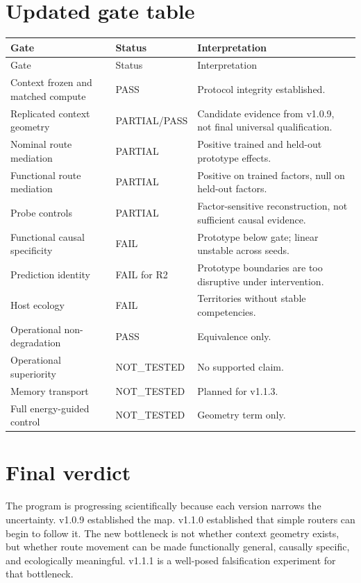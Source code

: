 \documentclass[11pt,a4paper]{article}
\begin{document}
\section{Updated gate table}
\begin{longtable}{p{5cm}p{2.2cm}p{7cm}}\toprule
Gate & Status & Interpretation\\\midrule\endfirsthead\toprule
Gate & Status & Interpretation\\\midrule\endhead
Context frozen and matched compute & PASS & Protocol integrity established.\\
Replicated context geometry & PARTIAL/PASS & Candidate evidence from v1.0.9, not final universal qualification.\\
Nominal route mediation & PARTIAL & Positive trained and held-out prototype effects.\\
Functional route mediation & PARTIAL & Positive on trained factors, null on held-out factors.\\
Probe controls & PARTIAL & Factor-sensitive reconstruction, not sufficient causal evidence.\\
Functional causal specificity & FAIL & Prototype below gate; linear unstable across seeds.\\
Prediction identity & FAIL for R2 & Prototype boundaries are too disruptive under intervention.\\
Host ecology & FAIL & Territories without stable competencies.\\
Operational non-degradation & PASS & Equivalence only.\\
Operational superiority & NOT\_TESTED & No supported claim.\\
Memory transport & NOT\_TESTED & Planned for v1.1.3.\\
Full energy-guided control & NOT\_TESTED & Geometry term only.\\
\bottomrule\end{longtable}

\section{Final verdict}
The program is progressing scientifically because each version narrows the uncertainty. v1.0.9 established the map. v1.1.0 established that simple routers can begin to follow it. The new bottleneck is not whether context geometry exists, but whether route movement can be made functionally general, causally specific, and ecologically meaningful. v1.1.1 is a well-posed falsification experiment for that bottleneck.

\printbibliography
\end{document}
